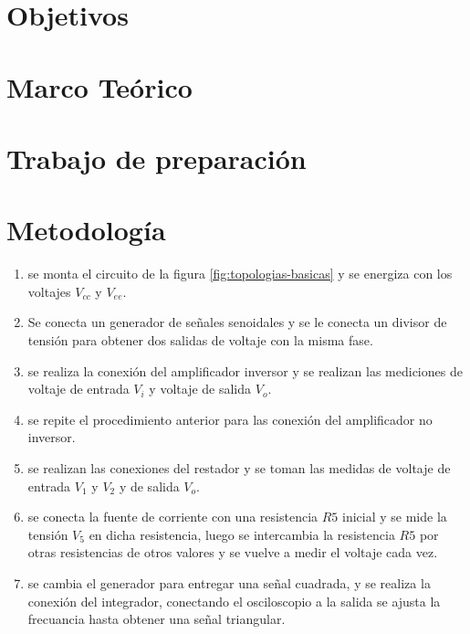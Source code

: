 \documentclass{article}
\begin{document}

\tableofcontents
\newpage

\section{Objetivos}



\section{Marco Teórico}



\section{Trabajo de preparación}



\FloatBarrier
\section{Metodología}

\begin{enumerate}
    \item se monta el circuito de la figura \ref{fig:topologias-basicas} y se energiza con los voltajes $V_{cc}$ y $V_{ee}$. 
    \item Se conecta un generador de señales senoidales y se le conecta un divisor de tensión para obtener dos salidas de voltaje con la misma fase.
    \item  se realiza la conexión del amplificador inversor y se realizan las mediciones de voltaje de entrada $V_i$ y voltaje de salida $V_o$.
    \item se repite el procedimiento anterior para las conexión del amplificador no inversor.
    \item se realizan las conexiones del restador y se toman las medidas de voltaje de entrada $V_1$ y $V_2$ y de salida $V_o$.
    \item se conecta la fuente de corriente con una resistencia $R5$ inicial y se mide la tensión $V_5$ en dicha resistencia, luego se intercambia la resistencia $R5$ por otras resistencias de otros valores y se vuelve a medir el voltaje cada vez.
    \item se cambia el generador para entregar una señal cuadrada, y se realiza la conexión del integrador, conectando el osciloscopio a la salida se ajusta la frecuancia hasta obtener una señal triangular.
\end{enumerate}
\end{document}
